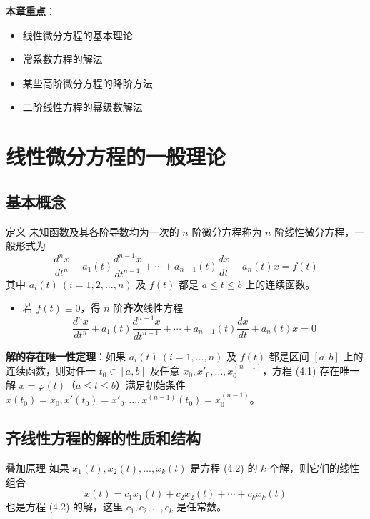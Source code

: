 \textbf{本章重点}：
\begin{itemize}
    \item 线性微分方程的基本理论
    \item 常系数方程的解法
    \item 某些高阶微分方程的降阶方法
    \item 二阶线性方程的幂级数解法
\end{itemize}

\section{线性微分方程的一般理论}

\subsection{基本概念}

\begin{mydefinition}{定义}
未知函数及其各阶导数均为一次的 $n$ 阶微分方程称为 $n$ 阶线性微分方程，一般形式为
\begin{equation}\frac{d^n x}{dt^n} + a_1(t)\frac{d^{n-1}x}{dt^{n-1}} + \cdots + a_{n-1}(t)\frac{dx}{dt} + a_n(t)x = f(t) \tag{4.1}\end{equation}
其中 $a_i(t)\ (i = 1, 2, \ldots, n)$ 及 $f(t)$ 都是 $a \le t \le b$ 上的连续函数。
\end{mydefinition}

\begin{itemize}
    \item 若 $f(t) \equiv 0$，得 $n$ 阶\textbf{齐次}线性方程
    \begin{equation}\frac{d^n x}{dt^n} + a_1(t)\frac{d^{n-1}x}{dt^{n-1}} + \cdots + a_{n-1}(t)\frac{dx}{dt} + a_n(t)x = 0 \tag{4.2}\end{equation}
\end{itemize}

\textbf{解的存在唯一性定理}：如果 $a_i(t)\ (i=1,\ldots,n)$ 及 $f(t)$ 都是区间 $[a,b]$ 上的连续函数，则对任一 $t_0 \in [a,b]$ 及任意 $x_0, x'_0, \ldots, x_0^{(n-1)}$，方程 (4.1) 存在唯一解 $x = \varphi(t)$（$a \le t \le b$）满足初始条件 $x(t_0) = x_0, x'(t_0) = x'_0, \ldots, x^{(n-1)}(t_0) = x_0^{(n-1)}$。

\subsection{齐线性方程的解的性质和结构}

\begin{myTheorem}{叠加原理}
如果 $x_1(t), x_2(t), \ldots, x_k(t)$ 是方程 (4.2) 的 $k$ 个解，则它们的线性组合
$$x(t) = c_1x_1(t) + c_2x_2(t) + \cdots + c_kx_k(t)$$
也是方程 (4.2) 的解，这里 $c_1, c_2, \ldots, c_k$ 是任常数。
\end{myTheorem}

